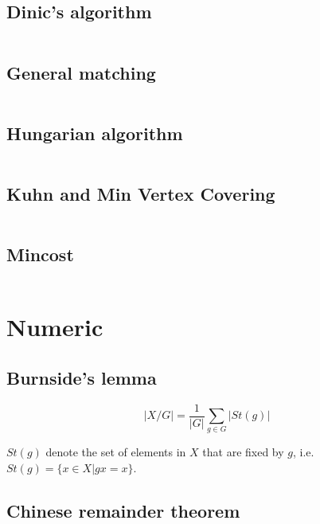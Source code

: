\documentclass{article}
\begin{document}
\subsection{Dinic's algorithm}
\inputminted[mathescape, breaklines, breakafter=(, tabsize=2, frame=lines, showtabs, tab=|\ , tabcolor=lightgray]{c++}{./graphs/dinic/dinic.cpp}
\subsection{General matching}
\inputminted[mathescape, breaklines, breakafter=(, tabsize=2, frame=lines, showtabs, tab=|\ , tabcolor=lightgray]{c++}{./graphs/general-matching/general-matching.cpp}
\subsection{Hungarian algorithm}
\inputminted[mathescape, breaklines, breakafter=(, tabsize=2, frame=lines, showtabs, tab=|\ , tabcolor=lightgray]{c++}{./graphs/hungarian-algorithm/hungarian-algorithm.cpp}
\subsection{Kuhn and Min Vertex Covering}
\inputminted[mathescape, breaklines, breakafter=(, tabsize=2, frame=lines, showtabs, tab=|\ , tabcolor=lightgray]{c++}{./graphs/kuhn-and-min-covering/kuhn-and-min-covering.cpp}
\subsection{Mincost}
\inputminted[mathescape, breaklines, breakafter=(, tabsize=2, frame=lines, showtabs, tab=|\ , tabcolor=lightgray]{c++}{./graphs/mincost/mincost.cpp}
\section{Numeric}
\subsection{Burnside's lemma}
$$|X/G| = \frac{1}{|G|}\sum\limits_{g \in G}|St(g)|$$

$St(g)$ denote the set of elements in $X$ that are fixed by $g$, i.e. $St(g) = \{x \in X | gx = x\}$.
\subsection{Chinese remainder theorem}
\inputminted[mathescape, breaklines, breakafter=(, tabsize=2, frame=lines, showtabs, tab=|\ , tabcolor=lightgray]{c++}{./numeric/chinese-remainder-theorem/chinese-remainder-theorem.cpp}
\end{document}
